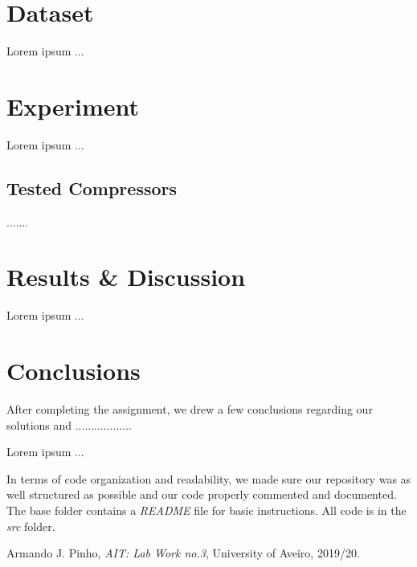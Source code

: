 \documentclass[12pt]{article}
\begin{document}
\section{Dataset}
Lorem ipsum ...


\section{Experiment}
Lorem ipsum ...

\subsection{Tested Compressors}
.......

\section{Results \& Discussion}
Lorem ipsum ...


\section{Conclusions}

After completing the assignment, we drew a few conclusions regarding our 
solutions and ..................

Lorem ipsum ...

In terms of code organization and readability, we made sure our 
repository was as well structured as possible and our code properly commented
and documented.
The base folder contains a {\it README\/} file for basic instructions.
All code is in the {\it src\/} folder.

\newpage
\begin{thebibliography}{9}
  

    Armando J. Pinho,
    \textit{AIT: Lab Work no.3},
    University of Aveiro,
    2019/20.
  
\end{thebibliography}

\clearpage
\end{document}
